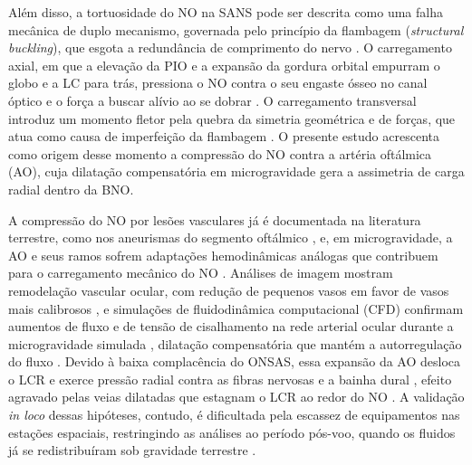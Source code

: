 \documentclass[article, hidelinks,oneside,12pt]{abntex2}
\begin{document}
Além disso, a tortuosidade do NO na SANS pode ser descrita como uma falha mecânica de duplo mecanismo, governada pelo princípio da flambagem (\textit{structural buckling}), que esgota a redundância de comprimento do nervo \cite{shin2017}. O carregamento axial, em que a elevação da PIO e a expansão da gordura orbital empurram o globo e a LC para trás, pressiona o NO contra o seu engaste ósseo no canal óptico e o força a buscar alívio ao se dobrar \cite{reilly2023, sigal2004, newson2006, islam2024}. O carregamento transversal introduz um momento fletor pela quebra da simetria geométrica e de forças, que atua como causa de imperfeição da flambagem \cite{jafari2025, lim2024, chiang2025, wang2016}. O presente estudo acrescenta como origem desse momento a compressão do NO contra a artéria oftálmica (AO), cuja dilatação compensatória em microgravidade gera a assimetria de carga radial dentro da BNO.

A compressão do NO por lesões vasculares já é documentada na literatura terrestre, como nos aneurismas do segmento oftálmico \cite{fujita, beatty, date}, e, em microgravidade, a AO e seus ramos sofrem adaptações hemodinâmicas análogas que contribuem para o carregamento mecânico do NO \cite{salerni2019, nigro2026}. Análises de imagem mostram remodelação vascular ocular, com redução de pequenos vasos em favor de vasos mais calibrosos \cite{vyas}, e simulações de fluidodinâmica computacional (CFD) confirmam aumentos de fluxo e de tensão de cisalhamento na rede arterial ocular durante a microgravidade simulada \cite{caddy2024}, dilatação compensatória que mantém a autorregulação do fluxo \cite{salerni2019, nigro2026}. Devido à baixa complacência do ONSAS, essa expansão da AO desloca o LCR e exerce pressão radial contra as fibras nervosas e a bainha dural \cite{nigro2026}, efeito agravado pelas veias dilatadas que estagnam o LCR ao redor do NO \cite{yang2022}. A validação \textit{in loco} dessas hipóteses, contudo, é dificultada pela escassez de equipamentos nas estações espaciais, restringindo as análises ao período pós-voo, quando os fluidos já se redistribuíram sob gravidade terrestre \cite{lee2018, mader2013, wahlin2021, rohr}.
\end{document}
